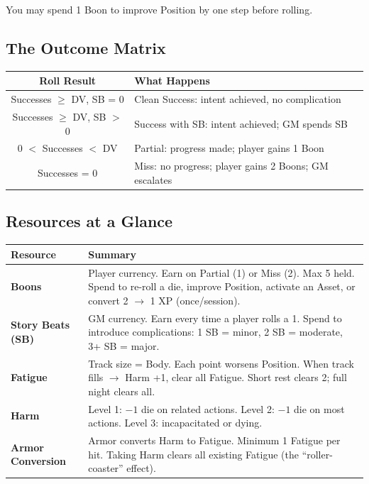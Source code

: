 \documentclass[10pt]{article}
\begin{document}
You may spend 1 Boon to improve Position by one step before rolling.

\subsection*{The Outcome Matrix}

\begin{center}
\begin{tabular}{|c|l|}
\hline
\textbf{Roll Result} & \textbf{What Happens} \\
\hline
Successes $\geq$ DV, SB = 0 & Clean Success: intent achieved, no complication \\
Successes $\geq$ DV, SB $>$ 0 & Success with SB: intent achieved; GM spends SB \\
0 $<$ Successes $<$ DV & Partial: progress made; player gains 1 Boon \\
Successes = 0 & Miss: no progress; player gains 2 Boons; GM escalates \\
\hline
\end{tabular}
\end{center}

\newpage

\subsection*{Resources at a Glance}

\begin{center}
\begin{tabular}{|p{4cm}|p{9cm}|}
\hline
\textbf{Resource} & \textbf{Summary} \\
\hline
\textbf{Boons} & Player currency. Earn on Partial (1) or Miss (2). Max 5 held. Spend to re-roll a die, improve Position, activate an Asset, or convert 2 $\to$ 1 XP (once/session). \\
\hline
\textbf{Story Beats (SB)} & GM currency. Earn every time a player rolls a 1. Spend to introduce complications: 1 SB = minor, 2 SB = moderate, 3+ SB = major. \\
\hline
\textbf{Fatigue} & Track size = Body. Each point worsens Position. When track fills $\to$ Harm +1, clear all Fatigue. Short rest clears 2; full night clears all. \\
\hline
\textbf{Harm} & Level 1: $-1$ die on related actions. Level 2: $-1$ die on most actions. Level 3: incapacitated or dying. \\
\hline
\textbf{Armor Conversion} & Armor converts Harm to Fatigue. Minimum 1 Fatigue per hit. Taking Harm clears all existing Fatigue (the ``roller-coaster'' effect). \\
\hline
\end{tabular}
\end{center}
\end{document}
